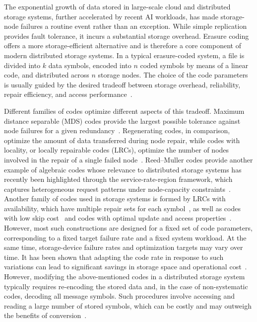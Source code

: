 \documentclass[conference, 10pt]{IEEEtran}
\theoremstyle{plain}
\theoremstyle{definition}
\begin{document}
The exponential growth of data stored in large-scale cloud and distributed storage systems, further accelerated by recent AI workloads, has made storage-node failures a routine event rather than an exception. While simple replication provides fault tolerance, it incurs a substantial storage overhead. Erasure coding offers a more storage-efficient alternative and is therefore a core component of modern distributed storage systems. In a typical erasure-coded system, a file is divided into $k$ data symbols, encoded into $n$ coded symbols by means of a linear code, and distributed across $n$ storage nodes. The choice of the code parameters is usually guided by the desired tradeoff between storage overhead, reliability, repair efficiency, and access performance~\cite{balaji2018erasure, shen2025survey}.

Different families of codes optimize different aspects of this tradeoff. Maximum distance separable (MDS) codes provide the largest possible tolerance against node failures for a given redundancy~\cite{roth2006introduction}. Regenerating codes, in comparison, optimize the amount of data transferred during node repair, while codes with locality, or locally repairable codes (LRCs), optimize the number of nodes involved in the repair of a single failed node~\cite{gopalan2012locality}. Reed--Muller codes provide another example of algebraic codes whose relevance to distributed storage systems has recently been highlighted through the
service-rate-region framework, which captures heterogeneous request patterns under
node-capacity constraints~\cite{ly2025servicelong,ly2025maximal}. 
Another family of codes used in storage systems is formed by LRCs with availability, which have multiple repair sets for each symbol~\cite{kruglik2017bounds}, as well as codes with low skip cost~\cite{zhang2025zigzag} and codes with optimal update and access properties~\cite{chen2020enabling}. However, most such constructions are designed for a fixed set of code parameters, corresponding to a fixed target failure rate and a fixed system workload. At the same time, storage-device failure rates and optimization targets may vary over time. It has been shown that adapting the code rate in response to such variations can lead to significant savings in storage space and operational cost~\cite{kadekodi2019cluster}. However, modifying the above-mentioned codes in a distributed storage system typically requires re-encoding the stored data and, in the case of non-systematic codes, decoding all message symbols. Such procedures involve accessing and reading a large number of stored symbols, which can be costly and may outweigh the benefits of conversion~\cite{maturana2022convertible}.
\end{document}
